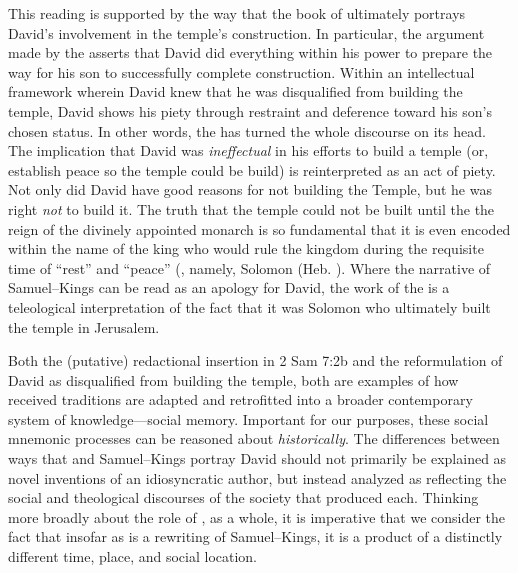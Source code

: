 This reading is supported by the way that the book of \chronicles ultimately portrays David's involvement in the temple's construction. In particular, the argument made by the \chronicler asserts that David did everything within his power to prepare the way for his son to successfully complete construction. Within an intellectual framework wherein David knew that he was disqualified from building the temple, David shows his piety through restraint and deference toward his son's chosen status. In other words, the \chronicler has turned the whole discourse on its head. The implication that David was \emph{ineffectual} in his efforts to build a temple (or, establish peace so the temple could be build) is reinterpreted as an act of piety. Not only did David have good reasons for not building the Temple, but he was right \emph{not} to build it. The truth that the temple could not be built until the the reign of the divinely appointed monarch is so fundamental that it is even encoded within the name of the king who would rule the kingdom during the requisite time of ``rest'' and ``peace'' (, namely, Solomon (Heb. ). Where the narrative of Samuel--Kings can be read as an apology for David, the work of the \chronicler is a teleological interpretation of the fact that it was Solomon who ultimately built the temple in Jerusalem.

Both the (putative) redactional insertion in 2 Sam 7:2b and the reformulation of David as disqualified from building the temple, both are examples of how received traditions are adapted and retrofitted into a broader contemporary system of knowledge---social memory. Important for our purposes, these social mnemonic processes can be reasoned about \emph{historically}. The differences between ways that \chronicles and Samuel--Kings portray David should not primarily be explained as novel inventions of an idiosyncratic author, but instead analyzed as reflecting the social and theological discourses of the society that produced each. Thinking more broadly about the role of \chronicles, as a whole, it is imperative that we consider the fact that insofar as \chronicles is a rewriting of Samuel--Kings, it is a product of a distinctly different time, place, and social location.

